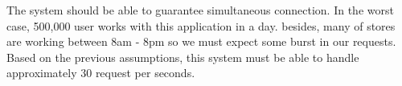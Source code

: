 The system should be able to guarantee simultaneous connection. In the worst case, 500,000 user works with this application in a day. besides, many of stores are working between 8am - 8pm so we must expect some burst in our requests. Based on the previous assumptions, this system must be able to handle approximately 30 request per seconds.\\
